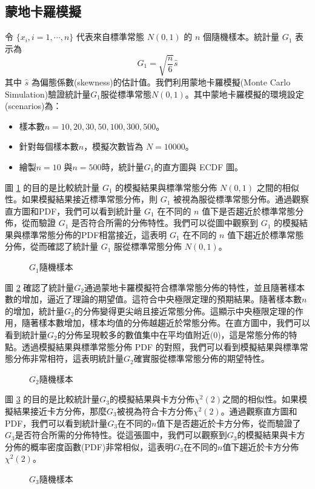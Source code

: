 \subsection{蒙地卡羅模擬}
令 $\{x_i, i=1,\cdots, n\}$ 代表來自標準常態 $N(0,1)$ 的 $n$ 個隨機樣本。統計量 $G_1$ 表示為
$$G_1 = \sqrt{\frac{n}{6}} \hat{s}$$
其中 $\hat{s}$ 為偏態係數(skewness)的估計值。我們利用蒙地卡羅模擬(Monte Carlo Simulation)驗證統計量$G_1$服從標準常態$N(0,1)$。其中蒙地卡羅模擬的環境設定(scenarios)為：
\begin{itemize}
\item 樣本數$n=10,20,30,50,100,300,500$。
\item 針對每個樣本數$n$，模擬次數皆為 $N=10000$。
\item 繪製$n=10$ 與$n=500$時，統計量$G_1$的直方圖與 ECDF 圖。
\end{itemize}
圖 \ref{fig:sampling-distribution_G1} 的目的是比較統計量 $G_1$ 的模擬結果與標準常態分佈 $N(0,1)$ 之間的相似性。如果模擬結果接近標準常態分佈，則 $G_1$ 被視為服從標準常態分佈。通過觀察直方圖和PDF，我們可以看到統計量 $G_1$ 在不同的 $n$ 值下是否趨近於標準常態分佈，從而驗證 $G_1$ 是否符合所需的分佈特性。我們可以從圖中觀察到 $G_1$ 的模擬結果與標準常態分佈的PDF相當接近，這表明 $G_1$ 在不同的 $n$ 值下趨近於標準常態分佈，從而確認了統計量 $G_1$ 服從標準常態分佈 $N(0,1)$。
\begin{figure}[h]
    \caption{$G_1$隨機樣本}
    \label{fig:sampling-distribution_G1}
\end{figure}

圖 \ref{fig:sampling-distribution_G2} 確認了統計量$G_2$通過蒙地卡羅模擬符合標準常態分佈的特性，並且隨著樣本數的增加，逼近了理論的期望值。這符合中央極限定理的預期結果。隨著樣本數$n$的增加，統計量$G_2$的分佈變得更尖峭且接近常態分佈。這顯示中央極限定理的作用，隨著樣本數增加，樣本均值的分佈越趨近於常態分佈。在直方圖中，我們可以看到統計量$G_2$的分佈呈現較多的數值集中在平均值附近(0)，這是常態分佈的特點。透過模擬結果與標準常態分佈 PDF 的對照，我們可以看到模擬結果與標準常態分佈非常相符，這表明統計量$G_2$確實服從標準常態分佈的期望特性。
\begin{figure}[h]
    \caption{$G_2$隨機樣本}
    \label{fig:sampling-distribution_G2}
\end{figure}




圖 \ref{fig:sampling-distribution_G3} 的目的是比較統計量$G_3$的模擬結果與卡方分佈$\chi ^2(2)$之間的相似性。如果模擬結果接近卡方分佈，那麼$G_3$被視為符合卡方分佈$\chi ^2(2)$。通過觀察直方圖和PDF，我們可以看到統計量$G_3$在不同的$n$值下是否趨近於卡方分佈，從而驗證了$G_3$是否符合所需的分佈特性。從這張圖中，我們可以觀察到$G_3$的模擬結果與卡方分佈的概率密度函數(PDF)非常相似，這表明$G_3$在不同的$n$值下趨近於卡方分佈$\chi ^2(2)$。
\begin{figure}[h]
    \caption{$G_3$隨機樣本}
    \label{fig:sampling-distribution_G3}
\end{figure}
